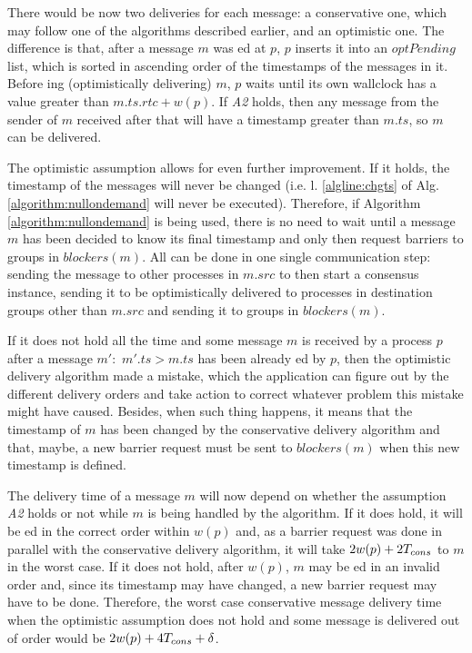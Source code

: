 \documentclass[times, 10pt]{article}
\begin{document}
There would be now two deliveries for each message: a conservative one, which may follow one of the algorithms described earlier, and an optimistic one. The difference is that, after a message $m$ was \rmd{}ed at $p$, $p$ inserts it into an $optPending$ list, which is sorted in ascending order of the timestamps of the messages in it. Before \opt{}ing (optimistically delivering) $m$, $p$ waits until its own wallclock has a value greater than $m.ts.rtc + w(p)$. If \emph{A2} holds, then any message from the sender of $m$ received after that will have a timestamp greater than $m.ts$, so $m$ can be delivered.

The optimistic assumption allows for even further improvement. If it holds, the timestamp of the messages will never be changed (i.e. l. \ref{algline:chgts} of Alg. \ref{algorithm:nullondemand} will never be executed). Therefore, if Algorithm \ref{algorithm:nullondemand} is being used, there is no need to wait until a message $m$ has been decided to know its final timestamp and only then request barriers to groups in $blockers(m)$. All can be done in one single communication step: sending the message to other processes in $m.src$ to then start a consensus instance, sending it to be optimistically delivered to processes in destination groups other than $m.src$ and sending it to groups in $blockers(m)$.

If it does not hold all the time and some message $m$ is received by a process $p$ after a message $m' :$ \mbox{$m'.ts > m.ts$} has been already \opt{}ed by $p$, then the optimistic delivery algorithm made a mistake, which the application can figure out by the different delivery orders and take action to correct whatever problem this mistake might have caused. Besides, when such thing happens, it means that the timestamp of $m$ has been changed by the conservative delivery algorithm and that, maybe, a new barrier request must be sent to $blockers(m)$ when this new timestamp is defined.

The delivery time of a message $m$ will now depend on whether the assumption \emph{A2} holds or not while $m$ is being handled by the algorithm. If it does hold, it will be \opt{}ed in the correct order within $w(p)$ and, as a barrier request was done in parallel with the conservative delivery algorithm, it will take $2w(p) + 2T_{cons}$ to \cons{} $m$ in the worst case. If it does not hold, after $w(p)$, $m$ may be \opt{}ed in an invalid order and, since its timestamp may have changed, a new barrier request may have to be done. Therefore, the worst case conservative message delivery time when the optimistic assumption does not hold and some message is delivered out of order would be $2w(p) + 4T_{cons} + \delta$.
\end{document}
